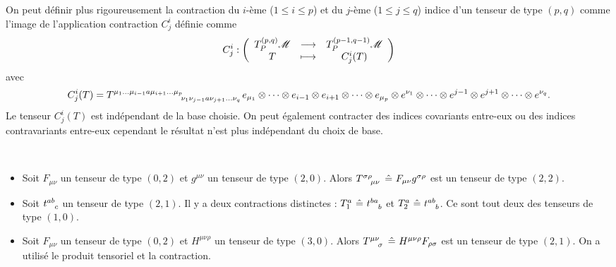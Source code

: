 \documentclass[a4paper,11pt]{report}
\begin{document}
                \begin{rmk}
                    On peut définir plus rigoureusement la contraction du $i$-ème ($1\leq i\leq p$) et du $j$-ème ($1\leq j\leq q$) indice d'un tenseur de type $(p,q)$ comme l'image de l'application contraction $C^i_j$ définie comme
                    \begin{equation}
                        C^i_j:\left(
                    \begin{array}{ccc}
                        T^{(p,q)}_P\mathscr{M} & \longrightarrow & T^{(p-1,q-1)}_P\mathscr{M} \\
                        T & \longmapsto & C^i_j(T)
                    \end{array}
                    \right)
                    \end{equation}
                    avec 
                    \begin{equation}
                        C^i_j(T) = T\indices{^{\mu_1\dots\mu_{i-1}a\mu_{i+1}\dots\mu_p}_{\nu_1\nu_{j-1}a\nu_{j+1}\dots\nu_q}} e_{\mu_1}\otimes\dots\otimes e_{i-1}\otimes  e_{i+1}\otimes\dots\otimes e_{\mu_p}\otimes e^{\nu_1}\otimes\dots\otimes e^{j-1}\otimes e^{j+1}\otimes\dots\otimes e^{\nu_q}.
                    \end{equation}
                    Le tenseur $C^i_j(T)$ est indépendant de la base choisie. On peut également contracter des indices covariants entre-eux ou des indices contravariants entre-eux cependant le résultat n'est plus indépendant du choix de base.
                \end{rmk}
                
                \begin{exmp}${}$
                    \begin{itemize}[label = \textbullet]
                        \item Soit $F_{\mu\nu}$ un tenseur de type $(0,2)$ et $g^{\mu\nu}$ un tenseur de type $(2,0)$. Alors $T\indices{^\sigma^\rho_\mu_\nu}~\hat{=}~F_{\mu\nu}g^{\sigma\rho}$ est un tenseur de type $(2,2)$.
                        \item Soit $t\indices{^a^b_c}$ un tenseur de type $(2,1)$. Il y a deux contractions distinctes : $T_1^a~\hat{=}~t\indices{^b^a_b}$ et $T_2^a~\hat{=}~t\indices{^a^b_b}$. Ce sont tout deux des tenseurs de type $(1,0)$.
                        \item Soit $F_{\mu\nu}$ un tenseur de type $(0,2)$ et $H^{\mu\nu\rho}$ un tenseur de type $(3,0)$. Alors $T\indices{^\mu^\nu_\sigma}~\hat{=}~H^{\mu\nu\rho}F_{\rho\sigma}$ est un tenseur de type $(2,1)$. On a utilisé le produit tensoriel et la contraction.
                    \end{itemize}
                \end{exmp}
                
\end{document}
